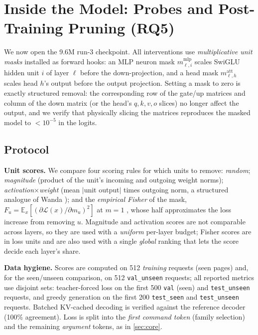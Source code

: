 \section{Inside the Model: Probes and Post-Training Pruning (RQ5)}
\label{sec:inside}

We now open the 9.6M run-3 checkpoint. All interventions use
\emph{multiplicative unit masks} installed as forward hooks: an MLP neuron
mask $m^{\text{mlp}}_{\ell,i}$ scales SwiGLU hidden unit $i$ of layer $\ell$
before the down-projection, and a head mask $m^{\text{att}}_{\ell,h}$ scales
head $h$'s output before the output projection. Setting a mask to zero is
exactly structured removal: the corresponding row of the gate/up matrices
and column of the down matrix (or the head's $q,k,v,o$ slices) no longer
affect the output, and we verify that physically slicing the matrices
reproduces the masked model to $<10^{-5}$ in the logits.

\subsection{Protocol}
\label{sec:inside-protocol}

\textbf{Unit scores.} We compare four scoring rules for which units to
remove: \emph{random}; \emph{magnitude} (product of the unit's incoming and
outgoing weight norms); \emph{activation$\times$weight} (mean $|$unit
output$|$ times outgoing norm, a structured analogue of Wanda
\citep{sun2024wanda}); and the \emph{empirical Fisher} of the mask,
$F_u = \mathbb{E}_x[(\partial \mathcal{L}(x)/\partial m_u)^2]$ at $m{=}1$
\citep{kwon2022fast,michel2019sixteen}, whose half approximates the loss
increase from removing $u$. Magnitude and activation scores are not
comparable across layers, so they are used with a \emph{uniform} per-layer
budget; Fisher scores are in loss units and are also used with a single
\emph{global} ranking that lets the score decide each layer's share.

\textbf{Data hygiene.} Scores are computed on 512 \emph{training} requests
(seen pages) and, for the seen/unseen comparison, on 512
\texttt{val\_unseen} requests; all reported metrics use disjoint sets:
teacher-forced loss on the first 500 \texttt{val} (seen) and
\texttt{test\_unseen} requests, and greedy generation on the first 200
\texttt{test\_seen} and \texttt{test\_unseen} requests. Batched KV-cached
decoding is verified against the reference decoder (100\% agreement). Loss
is split into the \emph{first command token} (family selection) and the
remaining \emph{argument} tokens, as in \cref{sec:core}.

